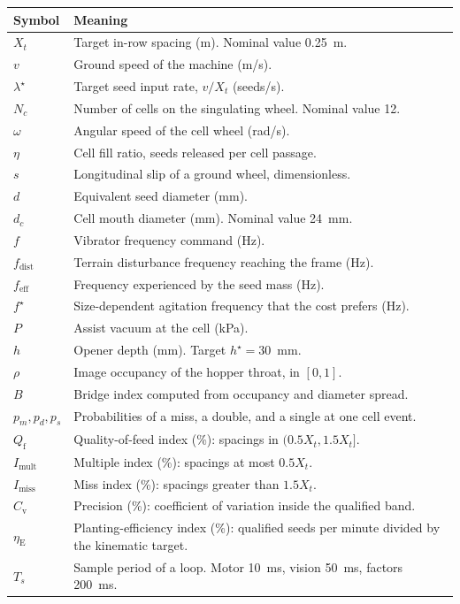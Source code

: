 \documentclass[12pt,a4paper]{report}
\numberwithin{equation}{chapter}
\numberwithin{figure}{chapter}
\numberwithin{table}{chapter}
\begin{document}
\begin{longtable}{@{}lp{}@{}}
\toprule
Symbol & Meaning \\
\midrule
\endhead
$X_t$ & Target in-row spacing (m). Nominal value 0.25~m. \\
$v$ & Ground speed of the machine (m/s). \\
$\lambda^{\star}$ & Target seed input rate, $v/X_t$ (seeds/s). \\
$N_c$ & Number of cells on the singulating wheel. Nominal value 12. \\
$\omega$ & Angular speed of the cell wheel (rad/s). \\
$\eta$ & Cell fill ratio, seeds released per cell passage. \\
$s$ & Longitudinal slip of a ground wheel, dimensionless. \\
$d$ & Equivalent seed diameter (mm). \\
$d_c$ & Cell mouth diameter (mm). Nominal value 24~mm. \\
$f$ & Vibrator frequency command (Hz). \\
$f_{\mathrm{dist}}$ & Terrain disturbance frequency reaching the frame (Hz). \\
$f_{\mathrm{eff}}$ & Frequency experienced by the seed mass (Hz). \\
$f^{\star}$ & Size-dependent agitation frequency that the cost prefers (Hz). \\
$P$ & Assist vacuum at the cell (kPa). \\
$h$ & Opener depth (mm). Target $h^{\star}=30$~mm. \\
$\rho$ & Image occupancy of the hopper throat, in $[0,1]$. \\
$B$ & Bridge index computed from occupancy and diameter spread. \\
$p_m,p_d,p_s$ & Probabilities of a miss, a double, and a single at one cell event. \\
$Q_{\mathrm{f}}$ & Quality-of-feed index (\%): spacings in $(0.5X_t,1.5X_t]$. \\
$I_{\mathrm{mult}}$ & Multiple index (\%): spacings at most $0.5X_t$. \\
$I_{\mathrm{miss}}$ & Miss index (\%): spacings greater than $1.5X_t$. \\
$C_{\mathrm{v}}$ & Precision (\%): coefficient of variation inside the qualified band. \\
$\eta_{\mathrm{E}}$ & Planting-efficiency index (\%): qualified seeds per minute divided by the kinematic target. \\
$T_s$ & Sample period of a loop. Motor 10~ms, vision 50~ms, factors 200~ms. \\
\bottomrule
\end{longtable}

\setcounter{page}{1}







\end{document}
